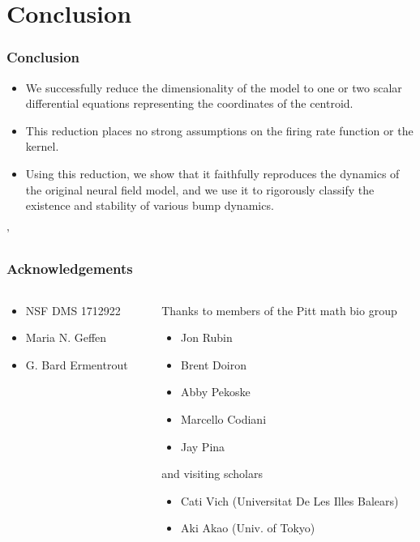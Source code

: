 \documentclass{beamer}
\begin{document}
\section{Conclusion}
\begin{frame}
 \frametitle{Conclusion}
 \vspace{-.1in}
 \begin{itemize}
  \item We successfully reduce the dimensionality of the model to one or two scalar differential equations representing the coordinates of the centroid.
  \item This reduction places no strong assumptions on the firing rate function or the kernel.
  \item Using this reduction, we show that it faithfully reproduces the dynamics of the original neural field model, and we use it to rigorously classify the existence and stability of various bump dynamics.
 \end{itemize}'


\end{frame}


\begin{frame}[noframenumbering]
 \frametitle{Acknowledgements}
 
 \begin{columns}
\begin{column}{0.5\textwidth}
\begin{itemize}
  \item NSF DMS 1712922
 \item Maria N. Geffen
 \item G. Bard Ermentrout
  \end{itemize}
  
\end{column}
\begin{column}{0.5\textwidth}  %
 Thanks to members of the Pitt math bio group
 \begin{itemize}
 \item Jon Rubin
 \item Brent Doiron
 \item Abby Pekoske
 \item Marcello Codiani
 \item Jay Pina
  \end{itemize}
  and visiting scholars
 \begin{itemize}
  \item Cati Vich (Universitat De Les Illes Balears)
  \item Aki Akao (Univ. of Tokyo)
 \end{itemize}



\end{column}
\end{columns}
 

\end{frame}
\end{document}
